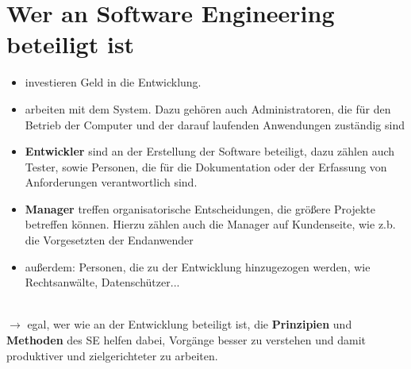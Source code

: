 \section{Wer an Software Engineering beteiligt ist}

\begin{itemize}
    \item {} investieren Geld in die Entwicklung.
    \item {} arbeiten mit dem System.
    Dazu gehören auch Administratoren, die für den Betrieb der Computer und der darauf laufenden Anwendungen zuständig sind
    \item \textbf{Entwickler} sind an der Erstellung der Software beteiligt, dazu zählen auch Tester, sowie Personen, die für die Dokumentation oder der Erfassung von Anforderungen verantwortlich sind.
    \item \textbf{Manager} treffen organisatorische Entscheidungen, die größere Projekte betreffen können.
     Hierzu zählen auch die Manager auf Kundenseite, wie z.b. die Vorgesetzten der Endanwender
    \item außerdem: Personen, die zu der Entwicklung hinzugezogen werden, wie Rechtsanwälte, Datenschützer...
\end{itemize}\\

\noindent
$\rightarrow$ egal, wer wie an der Entwicklung beteiligt ist, die \textbf{Prinzipien} und \textbf{Methoden} des SE helfen dabei, Vorgänge besser zu verstehen und damit produktiver und zielgerichteter zu arbeiten.

